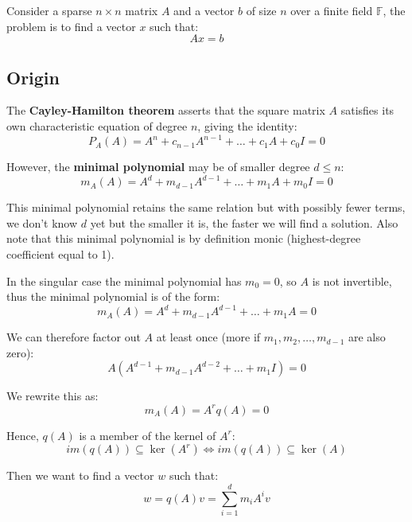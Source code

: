 \documentclass[a4paper, 11pt]{article}
\begin{document}
Consider a sparse $n \times n$ matrix $A$ and a vector $b$ of size $n$ over a finite field $\mathbb{F}$, the problem is to find a vector $x$ such that:
\begin{equation}
    Ax = b
\end{equation}

\subsection{Origin}
The \textbf{Cayley-Hamilton theorem} asserts that the square matrix $A$ satisfies its own characteristic equation of degree $n$, giving the identity:
\begin{equation}
    P_A(A) = A^n + c_{n-1}A^{n-1} + \dots + c_1A + c_0I = 0
\end{equation}

However, the \textbf{minimal polynomial} may be of smaller degree $d \leq n$:
\begin{equation}
    \label{eqn:minimal}
    m_A(A) = A^d + m_{d-1}A^{d-1} + \dots + m_1A + m_0I = 0
\end{equation}

This minimal polynomial retains the same relation but with possibly fewer terms, we don't know $d$ yet but the smaller it is, the faster we will find a solution. Also note that this minimal polynomial is by definition monic (highest-degree coefficient equal to 1).

In the singular case the minimal polynomial has $m_0=0$, so $A$ is not invertible, thus the minimal polynomial is of the form:
\begin{equation}
    m_A(A) = A^d + m_{d-1}A^{d-1} + \dots + m_1A = 0
\end{equation}

We can therefore factor out $A$ at least once (more if $m_1, m_2, \dots, m_{d-1}$ are also zero):
\begin{equation}
    A(A^{d-1} + m_{d-1}A^{d-2} + \dots + m_1I) = 0
\end{equation}
 
We rewrite this as:
\begin{equation}
    m_A(A) = A^r q(A) = 0
\end{equation}

Hence, $q(A)$ is a member of the kernel of $A^r$:
\begin{equation}
    im(q(A)) \subseteq \ker(A^r) \iff im(q(A)) \subseteq \ker(A)
\end{equation}

Then we want to find a vector $w$ such that:
\begin{equation}
    w = q(A)v = \sum^d_{i=1} m_i A^i v
\end{equation}
\end{document}
